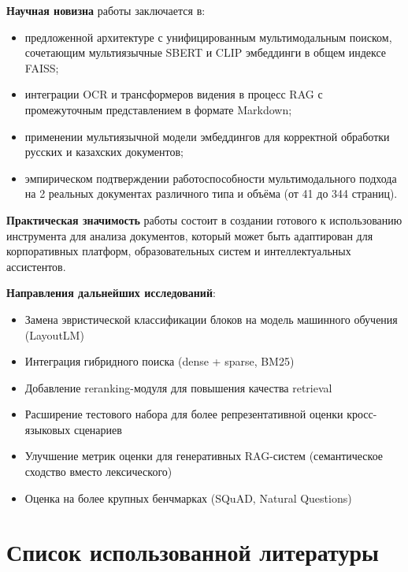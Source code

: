 \documentclass[a4paper,12pt]{article}
\begin{document}
\textbf{Научная новизна} работы заключается в:
\begin{itemize}
    \item предложенной архитектуре с унифицированным мультимодальным поиском, сочетающим мультиязычные SBERT и CLIP эмбеддинги в общем индексе FAISS;
    \item интеграции OCR и трансформеров видения в процесс RAG с промежуточным представлением в формате Markdown;
    \item применении мультиязычной модели эмбеддингов для корректной обработки русских и казахских документов;
    \item эмпирическом подтверждении работоспособности мультимодального подхода на 2 реальных документах различного типа и объёма (от 41 до 344 страниц).
\end{itemize}

\textbf{Практическая значимость} работы состоит в создании готового к использованию инструмента для анализа документов, который может быть адаптирован для корпоративных платформ, образовательных систем и интеллектуальных ассистентов.

\textbf{Направления дальнейших исследований}:
\begin{itemize}
    \item Замена эвристической классификации блоков на модель машинного обучения (LayoutLM)
    \item Интеграция гибридного поиска (dense + sparse, BM25)
    \item Добавление reranking-модуля для повышения качества retrieval
    \item Расширение тестового набора для более репрезентативной оценки кросс-языковых сценариев
    \item Улучшение метрик оценки для генеративных RAG-систем (семантическое сходство вместо лексического)
    \item Оценка на более крупных бенчмарках (SQuAD, Natural Questions)
\end{itemize}

\newpage

\section*{Список использованной литературы}
\end{document}
